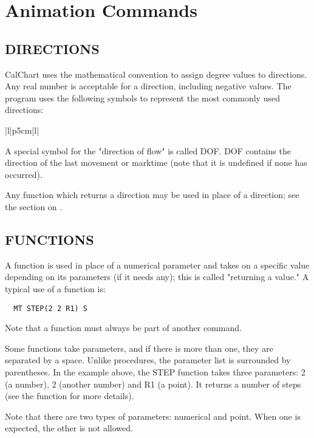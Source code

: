 \chapter{Animation Commands}\label{animcont}
\section{DIRECTIONS}\label{directions}

CalChart uses the mathematical convention to assign degree values to
directions.  Any real number is acceptable for a direction, including
negative values.  The program uses the following symbols to represent the
most commonly used directions:

\begin{tabular}{|l|p{5cm}|l|}\hline
{}\hline\hline
{}
\end{tabular}

A special symbol for the "direction of flow" is called DOF.  DOF contains
the direction of the last movement or marktime (note that it is undefined
if none has occurred).

Any function which returns a direction may be used in place of a direction;
see the section on .


\section{FUNCTIONS}\label{functions}

A function is used in place of a numerical parameter and takes on a
specific value depending on its parameters (if it needs any); this is
called "returning a value."  A typical use of a function is:
\begin{verbatim}
  MT STEP(2 2 R1) S
\end{verbatim}
Note that a function must always be part of another command.

Some functions take parameters, and if there is more than one, they are
separated by a space.  Unlike procedures, the parameter list is surrounded
by parentheses.  In the example above, the STEP function takes three
parameters: 2 (a number), 2 (another number) and R1 (a point).  It returns
a number of steps (see the  function for more details).

Note that there are two types of parameters: numerical and point.
When one is expected, the other is not allowed.


